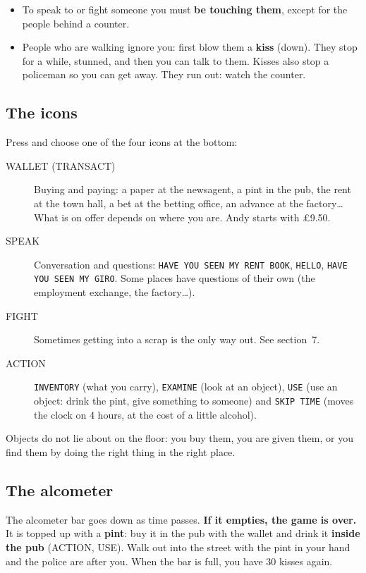 \begin{itemize}
\item To speak to or fight someone you must \textbf{be touching them}, except for the people behind a counter.
\item People who are walking ignore you: first blow them a \textbf{kiss} (down). They stop for a while, stunned, and then you can talk to them. Kisses also stop a policeman so you can get away. They run out: watch the counter.
\end{itemize}

\subsection*{The icons}
Press  and choose one of the four icons at the bottom:

\begin{description}
\item[WALLET (TRANSACT)] Buying and paying: a paper at the newsagent, a pint in the pub, the rent at the town hall, a bet at the betting office, an advance at the factory\ldots{} What is on offer depends on where you are. Andy starts with \pounds 9.50.
\item[SPEAK] Conversation and questions: \texttt{HAVE YOU SEEN MY RENT BOOK}, \texttt{HELLO}, \texttt{HAVE YOU SEEN MY GIRO}. Some places have questions of their own (the employment exchange, the factory\ldots).
\item[FIGHT] Sometimes getting into a scrap is the only way out. See section~7.
\item[ACTION] \texttt{INVENTORY} (what you carry), \texttt{EXAMINE} (look at an object), \texttt{USE} (use an object: drink the pint, give something to someone) and \texttt{SKIP TIME} (moves the clock on 4 hours, at the cost of a little alcohol).
\end{description}

Objects do not lie about on the floor: you buy them, you are given them, or you find them by doing the right thing in the right place.

\subsection*{The alcometer}
The alcometer bar goes down as time passes. \textbf{If it empties, the game is over.} It is topped up with a \textbf{pint}: buy it in the pub with the wallet and drink it \textbf{inside the pub} (ACTION, USE). Walk out into the street with the pint in your hand and the police are after you. When the bar is full, you have 30 kisses again.

